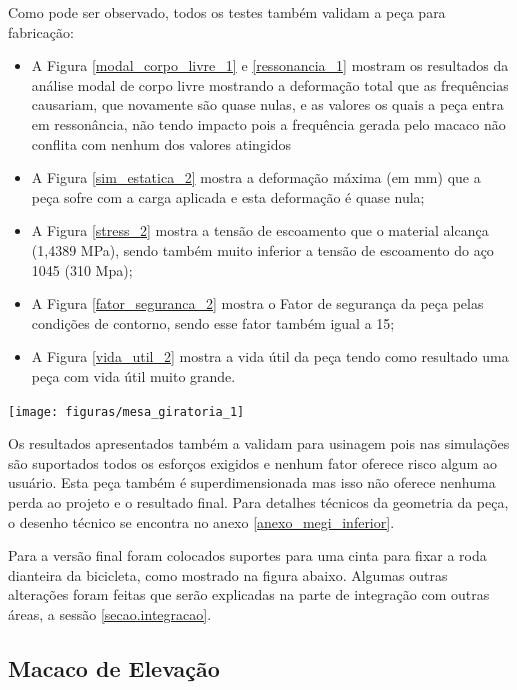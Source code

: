     Como pode ser observado, todos os testes também validam a peça para fabricação:
    \begin{itemize}
        \item A Figura \ref{modal_corpo_livre_1} e  \ref{ressonancia_1} mostram os resultados da análise modal de corpo livre mostrando a deformação total que as frequências causariam, que novamente são quase nulas, e as valores os quais a peça entra em ressonância, não tendo impacto pois a frequência gerada pelo macaco não conflita com nenhum dos valores atingidos
        \item A Figura \ref{sim_estatica_2} mostra a deformação máxima (em mm) que a peça sofre com a carga aplicada e esta deformação é quase nula;
        \item A Figura \ref{stress_2} mostra a tensão de escoamento que o material alcança (1,4389 MPa), sendo também muito inferior a tensão de escoamento do aço 1045 (310 Mpa);
        \item A Figura \ref{fator_seguranca_2} mostra o Fator de segurança da peça pelas condições de contorno, sendo esse fator também igual a 15;
        \item A Figura \ref{vida_util_2} mostra a vida útil da peça tendo como resultado uma peça com vida útil muito grande.
    \end{itemize}

    \begin{center}
        \texttt{[image: figuras/mesa\_giratoria\_1]}
        \label{mesa_giratoria_1}
    \end{center}

    Os resultados apresentados também a validam para usinagem pois nas simulações são suportados todos os esforços exigidos e nenhum fator oferece risco algum ao usuário. Esta peça também é superdimensionada mas isso não oferece nenhuma perda ao projeto e o resultado final. Para detalhes técnicos da geometria da peça, o desenho técnico se encontra no anexo \ref{anexo_megi_inferior}.
    
    Para a versão final foram colocados suportes para uma cinta para fixar a roda dianteira da bicicleta, como mostrado na figura abaixo. Algumas outras alterações foram feitas que serão explicadas na parte de integração com outras áreas, a sessão \ref{secao.integracao}.
    

\subsection{Macaco de Elevação}

